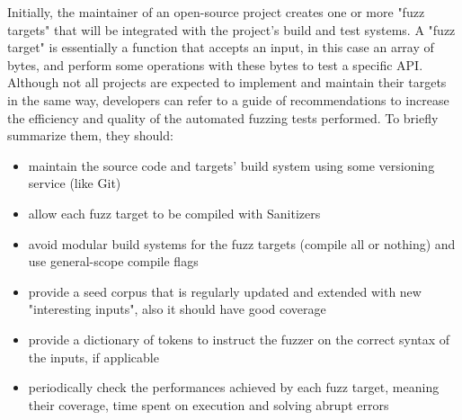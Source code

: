 \newpage
Initially, the maintainer of an open-source project creates one or more "fuzz targets" that will be integrated with the project's build and test systems. \cite{libfuzzer_docs}
\newline
A "fuzz target" is essentially a function that accepts an input, in this case an array of bytes, and perform some operations with these bytes to test a specific API.
\newline
Although not all projects are expected to implement and maintain their targets in the same way, developers can refer to a guide of recommendations to increase the efficiency and quality of the automated fuzzing tests performed.
\newline \newline
To briefly summarize them, they should:
\begin{itemize}
    \item maintain the source code and targets' build system using some versioning service (like Git)
    \item allow each fuzz target to be compiled with Sanitizers
    \item avoid modular build systems for the fuzz targets (compile all or nothing) and use general-scope compile flags
    \item provide a seed corpus that is regularly updated and extended with new "interesting inputs", also it should have good coverage
    \item provide a dictionary of tokens to instruct the fuzzer on the correct syntax of the inputs, if applicable
    \item periodically check the performances achieved by each fuzz target, meaning their coverage, time spent on execution and solving abrupt errors
\end{itemize}



